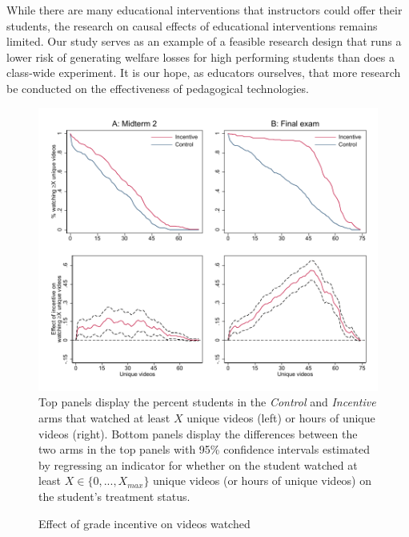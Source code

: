 \documentclass[12pt]{article}
\begin{document}
While there are many educational interventions that instructors could offer their students, the research on causal effects of educational interventions remains limited. Our study serves as an example of a feasible research design that runs a lower risk of generating welfare losses for high performing students than does a class-wide experiment. It is our hope, as educators ourselves, that more research be conducted on the effectiveness of pedagogical technologies.

\printbibliography


\clearpage


\clearpage


\clearpage


\clearpage


\clearpage



\clearpage
\begin{figure}[t]
\begin{center}
\caption{Effect of grade incentive on videos watched}
\label{combo_cdf}
\includegraphics[width=1\textwidth, angle=0]{../plots/combo_cdf.pdf}
\footnotesize Top panels display the percent students in the \textit{Control}
 and \textit{Incentive} arms that watched at least $X$ unique videos (left) or hours of unique videos (right). Bottom panels display the differences between the two arms in the top panels with 95\% confidence intervals estimated by regressing an indicator for whether on the student watched at least $X\in\{0,...,X_{max}\}$ unique videos (or hours of unique videos) on the student's treatment status.
\end{center}
\end{figure}
\end{document}
